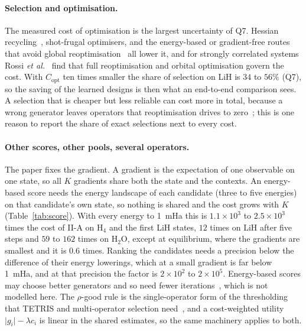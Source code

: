 \documentclass[aps,pra,reprint,superscriptaddress,nofootinbib]{revtex4-2}
\begin{document}
\paragraph{Selection and optimisation.} The measured cost of optimisation is the largest uncertainty of Q7. Hessian recycling~\cite{ramoa2025hessian}, shot-frugal optimisers, and the energy-based or gradient-free routes that avoid global reoptimisation~\cite{feniou2025,jager2025} all lower it, and for strongly correlated systems Rossi \textit{et al.}~\cite{rossi2026} find that full reoptimisation and orbital optimisation govern the cost. With $C_\mathrm{opt}$ ten times smaller the share of selection on LiH is $34$ to $56\%$ (Q7), so the saving of the learned designs is then what an end-to-end comparison sees. A selection that is cheaper but less reliable can cost more in total, because a wrong generator leaves operators that reoptimisation drives to zero~\cite{vaquero2025}; this is one reason to report the share of exact selections next to every cost.

\paragraph{Other scores, other pools, several operators.} The paper fixes the gradient. A gradient is the expectation of one observable on one state, so all $K$ gradients share both the state and the contexts. An energy-based score needs the energy landscape of each candidate (three to five energies) on that candidate's own state, so nothing is shared and the cost grows with $K$ (Table~\ref{tab:score}). With every energy to 1~mHa this is $1.1\times10^{3}$ to $2.5\times10^{3}$ times the cost of II-A on H$_4$ and the first LiH states, $12$ times on LiH after five steps and $59$ to $162$ times on H$_2$O, except at equilibrium, where the gradients are smallest and it is $0.6$ times. Ranking the candidates needs a precision below the difference of their energy lowerings, which at a small gradient is far below 1~mHa, and at that precision the factor is $2\times10^{2}$ to $2\times10^{5}$. Energy-based scores may choose better generators and so need fewer iterations~\cite{rossi2026}, which is not modelled here. The $\rho$-good rule is the single-operator form of the thresholding that TETRIS and multi-operator selection need~\cite{anastasiou2024tetris}, and a cost-weighted utility $\lvert g_i\rvert-\lambda c_i$ is linear in the shared estimates, so the same machinery applies to both.
\end{document}

